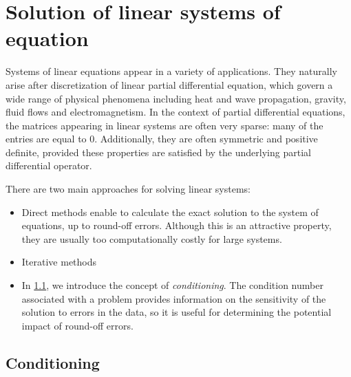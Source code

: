 \chapter{Solution of linear systems of equation}
\label{cha:solution_of_linear_systems}

Systems of linear equations appear in a variety of applications.
They naturally arise after discretization of linear partial differential equation,
which govern a wide range of physical phenomena including heat and wave propagation, 
gravity, fluid flows and electromagnetism.
In the context of partial differential equations,
the matrices appearing in linear systems are often very sparse: many of the entries are equal to 0.
Additionally, they are often symmetric and positive definite,
provided these properties are satisfied by the underlying partial differential operator.

There are two main approaches for solving linear systems: 
\begin{itemize}
    \item 
        Direct methods enable to calculate the exact solution to the system of equations, 
        up to round-off errors.
        Although this is an attractive property,
        they are usually too computationally costly for large systems.

    \item 
        Iterative methods
\end{itemize}


\begin{itemize}
    \item 
        In \cref{sec:conditioning},
        we introduce the concept of \emph{conditioning}.
        The condition number associated with a problem provides information on the sensitivity of the solution to errors in the data,
        so it is useful for determining the potential impact of round-off errors.
\end{itemize}

\section{Conditioning}%
\label{sec:conditioning}
